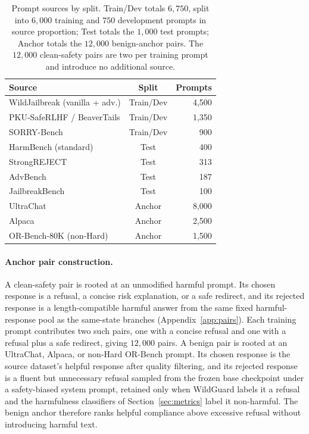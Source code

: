 \documentclass[11pt]{article}
\begin{document}
\begin{table}[t]
  \centering
  \small
  \begin{tabular}{lcr}
    \toprule
    Source & Split & Prompts \\
    \midrule
    WildJailbreak (vanilla + adv.) & Train/Dev & 4{,}500 \\
    PKU-SafeRLHF / BeaverTails     & Train/Dev & 1{,}350 \\
    SORRY-Bench                    & Train/Dev & 900 \\
    \midrule
    HarmBench (standard)           & Test      & 400 \\
    StrongREJECT                   & Test      & 313 \\
    AdvBench                       & Test      & 187 \\
    JailbreakBench                 & Test      & 100 \\
    \midrule
    UltraChat                      & Anchor    & 8{,}000 \\
    Alpaca                         & Anchor    & 2{,}500 \\
    OR-Bench-80K (non-Hard)        & Anchor    & 1{,}500 \\
    \bottomrule
  \end{tabular}
  \caption{Prompt sources by split. Train/Dev totals \(6{,}750\), split into
  \(6{,}000\) training and \(750\) development prompts in source proportion;
  Test totals the \(1{,}000\) test prompts; Anchor totals the \(12{,}000\)
  benign-anchor pairs. The \(12{,}000\) clean-safety pairs are two per
  training prompt and introduce no additional source.}
  \label{tab:data-sources}
\end{table}

\paragraph{Anchor pair construction.}
A clean-safety pair is rooted at an unmodified harmful prompt. Its chosen
response is a refusal, a concise risk explanation, or a safe redirect, and its
rejected response is a length-compatible harmful answer from the same fixed
harmful-response pool as the same-state branches (Appendix~\ref{app:pairs}).
Each training prompt contributes two such pairs, one with a concise refusal and
one with a refusal plus a safe redirect, giving \(12{,}000\) pairs. A benign
pair is rooted at an UltraChat, Alpaca, or non-Hard OR-Bench prompt. Its chosen
response is the source dataset's helpful response after quality filtering, and
its rejected response is a fluent but unnecessary refusal sampled from the
frozen base checkpoint under a safety-biased system prompt, retained only when
WildGuard labels it a refusal and the harmfulness classifiers of
Section~\ref{sec:metrics} label it non-harmful. The benign anchor therefore
ranks helpful compliance above excessive refusal without introducing harmful
text.
\end{document}

